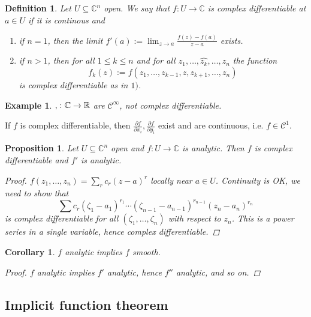 \documentclass[12pt]{article}
\theoremstyle{darkgreentheorem}
\newtheorem{prop}[thm]{Proposition}
\newtheorem{cor}[thm]{Corollary}
\theoremstyle{darkbluedefinition}
\newtheorem{defn}[thm]{Definition}
\theoremstyle{darkredexample}
\newtheorem{exa}[thm]{Example}
\theoremstyle{remark}
\newcommand{\R}{\mathbb{R}}
\newcommand{\1}{\mathbbm{1}}
\newcommand{\C}{\mathbb{C}}
\newcommand{\calC}{\mathcal{C}}
\let\Re\relax
\DeclareMathOperator{\Re}{Re}
\let\Im\relax
\DeclareMathOperator{\Im}{Im}
\begin{document}
\begin{defn}
    Let $U\subseteq \C^{n}$ open.
    We say that $f\colon U\to \C$ is \textit{complex differentiable} at $a\in U$ if it is continous and
    \begin{enumerate}[label=\roman*)]
	\item if $n=1$, then the limit $f'(a):=\lim_{z\to a}\frac{f(z)-f(a)}{z-a}$ exists.
	\item if $n>1$, then for all $1\leqslant k\leqslant n$ and for all $z_{1},\ldots,\hat{z_{k}},\ldots,z_{n}$ the function
	    \[ f_{k}(z):=f(z_{1},\ldots,z_{k-1},z,z_{k+1},\ldots,z_{n})\]
	    is complex differentiable as in $1)$.
    \end{enumerate}
\end{defn}

\begin{exa}
    $\Re,\Im\colon \C\to \R$ are $\calC^{\infty}$, not complex differentiable.
\end{exa}

If $f$ is complex differentiable, then $\frac{\partial f}{\partial x_{i}},\frac{\partial f}{\partial y_{i}}$ exist and are continuous, i.e. $f\in \calC^{1}$.

\begin{prop}
    Let $U\subseteq \C^{n}$ open and $f\colon U\to \C$ is analytic.
    Then $f$ is complex differentiable and $f'$ is analytic.
    \begin{proof}
	$f(z_{1},\ldots,z_{n})=\sum_{r}c_{r}(z-a)^{r}$ locally near $a\in U$.
	Continuity is OK, we need to show that
	\[ \sum c_{r}(\zeta_{1}-a_{1})^{r_{1}}\cdots (\zeta_{n-1}-a_{n-1})^{r_{n-1}}(z_{n}-a_{n})^{r_{n}}\]
	is complex differentiable for all $(\zeta_{1},\ldots,\zeta_{n})$ with respect to $z_{n}$.
	This is a power series in a single variable, hence complex differentiable.
    \end{proof}
\end{prop}

\begin{cor}
    $f$ analytic implies $f$ smooth.
    \begin{proof}
	$f$ analytic implies $f'$ analytic, hence $f''$ analytic, and so on.
    \end{proof}
\end{cor}

\subsection{Implicit function theorem}
\end{document}
